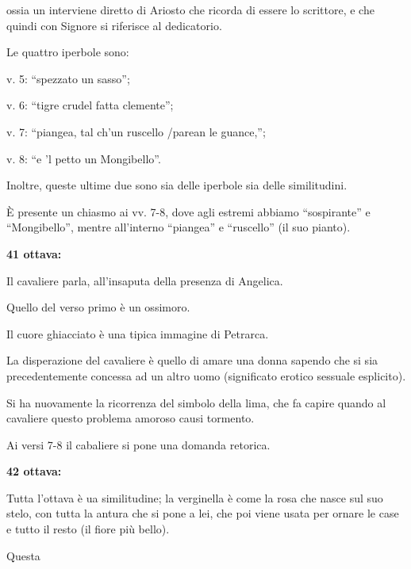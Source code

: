 \documentclass{article}
\begin{document}
\begin{enumerate}
\begin{subenumerate}
        ossia un interviene diretto di Ariosto che ricorda di essere lo scrittore, e che quindi con Signore si riferisce al
        dedicatorio.
        \item Le quattro iperbole sono: \begin{subenumerate}
            \item v. 5: “spezzato un sasso”;
            \item v. 6: “tigre crudel fatta clemente”;
            \item v. 7: “piangea, tal ch’un ruscello /parean le guance,”;
            \item v. 8: “e ’l petto un Mongibello”.
        \end{subenumerate}
        \item Inoltre, queste ultime due sono sia delle iperbole sia delle similitudini.
        \item È presente un chiasmo ai vv. 7-8, dove agli estremi abbiamo “sospirante” e “Mongibello”, mentre all’interno
        “piangea” e “ruscello” (il suo pianto).
    \end{subenumerate}
    \item \textbf{41 ottava:} \begin{subenumerate}
        \item Il cavaliere parla, all’insaputa della presenza di Angelica.
        \item Quello del verso primo è un ossimoro.
        \item Il
        cuore ghiacciato è una tipica immagine di Petrarca. 
        \item La disperazione del cavaliere è quello di amare una
        donna sapendo che si sia precedentemente concessa ad un altro uomo (significato erotico sessuale esplicito).
        \item Si ha nuovamente la ricorrenza del simbolo della lima, che fa capire quando al cavaliere questo
        problema amoroso causi tormento.
        \item Ai versi 7-8 il cabaliere si pone una domanda retorica.
    \end{subenumerate}
    \item \textbf{42 ottava:} \begin{subenumerate}
        \item Tutta l’ottava è ua similitudine; la verginella è come la rosa che nasce sul suo stelo, con tutta la
        antura che si pone a lei, che poi viene usata per ornare le case e tutto il resto (il fiore più bello).
        \item Questa

\end{subenumerate}
\end{enumerate}
\end{document}
